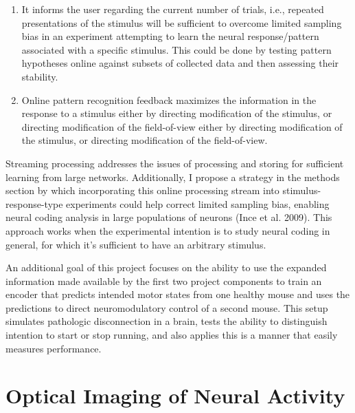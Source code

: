 \documentclass[
  12pt,
]{report}
\numberwithin{figure}{section}
\numberwithin{table}{section}
\numberwithin{equations}{section}
\begin{document}
\begin{enumerate}
\def\labelenumi{\arabic{enumi}.}
\item
  It informs the user regarding the current number of trials, i.e.,
  repeated presentations of the stimulus will be sufficient to overcome
  limited sampling bias in an experiment attempting to learn the neural
  response/pattern associated with a specific stimulus. This could be
  done by testing pattern hypotheses online against subsets of collected
  data and then assessing their stability.
\item
  Online pattern recognition feedback maximizes the information in the
  response to a stimulus either by directing modification of the
  stimulus, or directing modification of the field-of-view either by
  directing modification of the stimulus, or directing modification of
  the field-of-view.
\end{enumerate}

Streaming processing addresses the issues of processing and storing for
sufficient learning from large networks. Additionally, I propose a
strategy in the methods section by which incorporating this online
processing stream into stimulus-response-type experiments could help
correct limited sampling bias, enabling neural coding analysis in large
populations of neurons (Ince et al. 2009). This approach works when the
experimental intention is to study neural coding in general, for which
it's sufficient to have an arbitrary stimulus.

An additional goal of this project focuses on the ability to use the
expanded information made available by the first two project components
to train an encoder that predicts intended motor states from one healthy
mouse and uses the predictions to direct neuromodulatory control of a
second mouse. This setup simulates pathologic disconnection in a brain,
tests the ability to distinguish intention to start or stop running, and
also applies this is a manner that easily measures performance.

\hypertarget{optical-imaging-of-neural-activity}{%
\section{Optical Imaging of Neural
Activity}\label{optical-imaging-of-neural-activity}}
\end{document}
